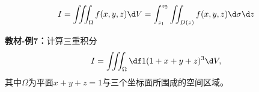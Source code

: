 $${I=\iiint_{\Omega}f(x,y,z)\d
V=\int_{z_1}^{z_2}\iint_{D(z)}f(x,y,z)\d\sigma \d z}$$

{\bf 教材-例7：}计算三重积分
$$I=\iiint_{\Omega}\df1{(1+x+y+z)^3}\d V,$$
其中$\Omega$为平面$x+y+z=1$与三个坐标面所围成的空间区域。

\begin{center}
\end{center}

